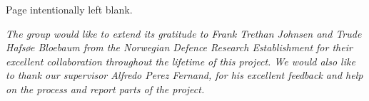 \vspace*{\fill}
\begin{center}
Page intentionally left blank.
\end{center}
\vspace*{\fill}

\pagebreak

\vspace*{7cm}
\begin{center}

\emph{The group would like to extend its gratitude to Frank Trethan Johnsen and Trude Hafsøe Bloebaum from the Norwegian Defence Research Establishment for their excellent collaboration throughout the lifetime of this project. We would also like to thank our supervisor Alfredo Perez Fernand, for his excellent feedback and help on the process and report parts of the project.}

\end{center}